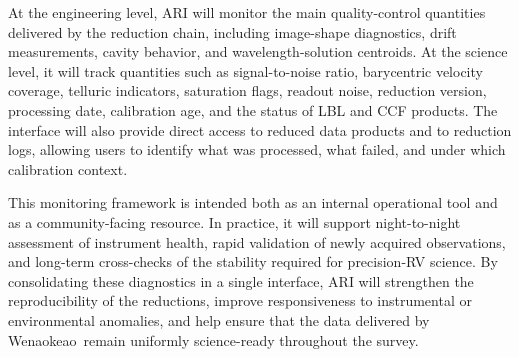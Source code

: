 \documentclass[
    traditabstract,
    longauth,
    onecolumn,
]{aa}
\def \amakihi{`AMAKIHI}
\def \spi{SPIRou}
\def \wena{Wenaokeao}
\begin{document}
At the engineering level, ARI will monitor the main quality-control quantities delivered by the reduction chain, including image-shape diagnostics, drift measurements, cavity behavior, and wavelength-solution centroids. At the science level, it will track quantities such as signal-to-noise ratio, barycentric velocity coverage, telluric indicators, saturation flags, readout noise, reduction version, processing date, calibration age, and the status of LBL and CCF products. The interface will also provide direct access to reduced data products and to reduction logs, allowing users to identify what was processed, what failed, and under which calibration context.

This monitoring framework is intended both as an internal operational tool and as a community-facing resource. In practice, it will support night-to-night assessment of instrument health, rapid validation of newly acquired observations, and long-term cross-checks of the stability required for precision-RV science. By consolidating these diagnostics in a single interface, ARI will strengthen the reproducibility of the reductions, improve responsiveness to instrumental or environmental anomalies, and help ensure that the data delivered by \wena\ remain uniformly science-ready throughout the survey.





%    
\end{document}
